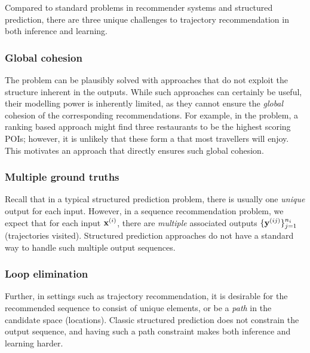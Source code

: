 Compared to
standard problems in recommender systems and structured prediction,
there are three unique challenges to trajectory recommendation
in both inference and learning.


\subsubsection{Global cohesion}
The {\seqrec} problem can be plausibly solved with approaches that do not exploit the structure inherent in the outputs. %
While such approaches can certainly be useful,
their modelling power is inherently limited,
as
they cannot ensure the \emph{global} cohesion of the corresponding recommendations. %
For example, in the {\trajrec} problem, a ranking based approach %
might find three restaurants to be the highest scoring POIs;
however, it is unlikely that these form a {\trajectory} that most travellers will enjoy.
This motivates an approach %
that directly ensures such global cohesion.


\subsubsection{Multiple ground truths}
%
Recall that in a typical structured prediction problem,
there is usually one \emph{unique} output for each input.
However, in a sequence recommendation problem,
we expect that for each input $\mathbf{x}^{({i})}$, %
there are \emph{multiple} associated outputs
$\{ \mathbf{y}^{({ij})} \}_{j=1}^{n_i}$ (\ie trajectories visited).
Structured prediction approaches do not have a standard way to handle such multiple output sequences.


\subsubsection{Loop elimination}
Further, in settings such as trajectory recommendation, it is desirable for the recommended sequence to consist of unique elements,
or be a {\em path} in the candidate space (\eg locations).
Classic structured prediction does not constrain the output sequence, and having such a
path constraint makes both inference and learning harder.


